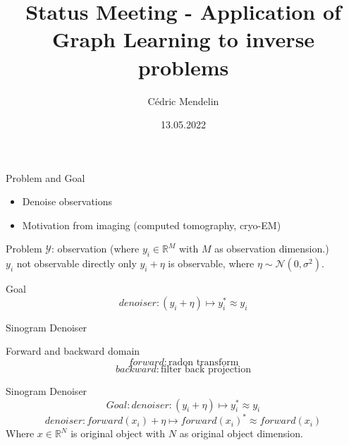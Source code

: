\documentclass[aspectratio=169]{beamer}
\title              {Status Meeting - Application of Graph Learning to inverse problems}
\author     		{Cédric Mendelin}
\institute          {Department of Mathematics and Computer Science, University of Basel}
\date               {13.05.2022}
\begin{document}

\begin{frame}[t,plain]
    \titlepage
\end{frame}




\begin{frame}{Problem and Goal}
    \begin{itemize}
        \item Denoise observations
        \item Motivation from imaging (computed tomography, cryo-EM)
    \end{itemize}

    \pause
    \begin{block}{Problem}
        $\mathcal{Y}$: observation (where $y_i \in \mathbb{R}^M$ with $M$ as observation dimension.) \\
        $y_i$ not observable directly only $y_i + \eta$ is observable, where $\eta \sim \mathcal{N}(0,\sigma^2)$.
    \end{block}

    \begin{block}{Goal}
        $$ denoiser:   (y_i + \eta) \mapsto y_i^* \approx y_i $$ 
    \end{block}

\end{frame}

\begin{frame}{Sinogram Denoiser}
    \begin{block}{Forward and backward domain}
        $$ forward : \text{radon transform} $$
        $$ backward : \text{filter back projection} $$
    \end{block}    
    
    \pause

    \begin{block}{Sinogram Denoiser}
        $$ Goal:  denoiser:   (y_i + \eta) \mapsto y_i^* \approx y_i $$         
        $$ denoiser:  forward(x_i) + \eta \mapsto forward(x_i)^* \approx forward(x_i) $$ 
        \center
        Where $x \in \mathbb{R}^N$ is original object with $N$ as original object dimension. \\
    \end{block}
\end{frame}
\end{document}
